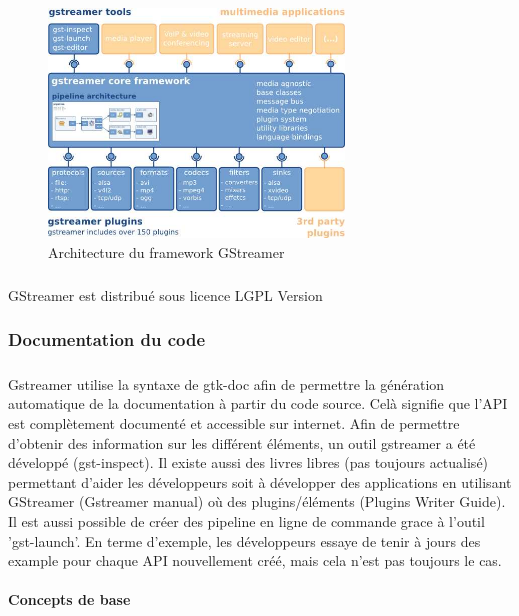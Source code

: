 \begin{figure}

  \begin{center}

    \includegraphics[width=0.70\textwidth]{images/gstoverview}

  \end{center}

  \caption{Architecture du framework GStreamer}

  \label{Yes}

\end{figure}

\subparagraph{}

GStreamer est distribué sous licence LGPL Version

\subsubsection{Documentation du code}

\subparagraph{} Gstreamer utilise la syntaxe de gtk-doc afin de
permettre la génération automatique de la documentation à partir du
code source. Celà signifie que l'API est complètement documenté et
accessible sur internet. Afin de permettre d'obtenir des information
sur les différent éléments, un outil gstreamer a été développé
(gst-inspect). Il existe aussi des livres libres (pas toujours actualisé)
permettant d'aider les développeurs soit à développer des applications
en utilisant GStreamer (Gstreamer manual) où des plugins/éléments
(Plugins Writer Guide).  Il est aussi possible de créer des pipeline en
ligne de commande grace à l'outil 'gst-launch'.  En terme d'exemple,
les développeurs essaye de tenir à jours des example pour chaque API
nouvellement créé, mais cela n'est pas toujours le cas.

\paragraph{Concepts de base}

